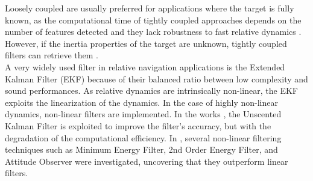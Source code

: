 Loosely coupled are usually preferred for applications where the target is fully known, as the computational time of tightly coupled approaches depends on the number of features detected and they lack robustness to fast relative dynamics \cite{pesce2019autonomous}. However, if the inertia properties of the target are unknown,  tightly coupled filters can retrieve them \cite{volpe2017pose}.\\ 
A very widely used filter in relative navigation applications is the Extended Kalman Filter (EKF) \cite{sharma2017reduced, pesce2019autonomous, galante2016fast} because of their balanced ratio between low complexity and sound performances. As relative dynamics are intrinsically non-linear, the EKF exploits the linearization of the dynamics. In the case of highly non-linear dynamics, non-linear filters are implemented. In the works \cite{volpe2017pose, zhang2015unscented}, the Unscented Kalman Filter is exploited to improve the filter's accuracy, but with the degradation of the computational efficiency. In \cite{pesce2019comparison}, several non-linear filtering techniques such as Minimum Energy Filter, 2nd Order Energy Filter, and Attitude Observer were investigated, uncovering that they outperform linear filters.


